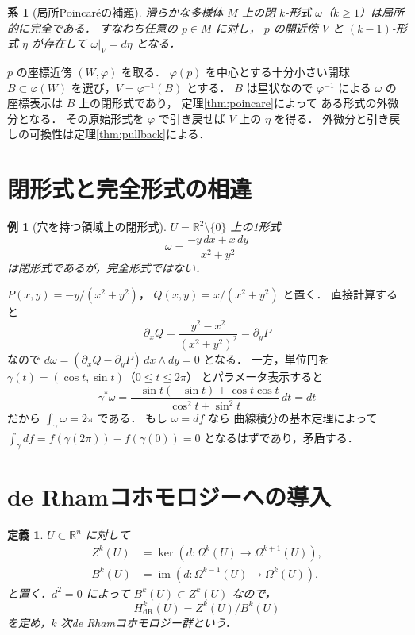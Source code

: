 \documentclass[a5paper,10pt,onecolumn]{jsarticle}
\makeatletter
\theoremstyle{mathnotetheorem}
\newtheorem{definition}[theorem]{定義}
\newtheorem{corollary}[theorem]{系}
\newtheorem{example}[theorem]{例}
\renewcommand{\proofname}{証明}
\renewenvironment{proof}[1][\proofname]{%
  \par\pushQED{\qed}\normalfont\topsep4\p@\@plus2\p@\relax
  \trivlist\item[\hskip\labelsep\bfseries #1]\ignorespaces
}{\popQED\endtrivlist\@endpefalse}
\makeatother
\begin{document}
\begin{corollary}[局所Poincar\'eの補題]\label{cor:local-poincare}
滑らかな多様体 $M$ 上の閉 $k$-形式
$\omega$（$k\ge1$）は局所的に完全である．
すなわち任意の $p\in M$ に対し，
$p$ の開近傍 $V$ と
$(k-1)$-形式 $\eta$ が存在して
$\omega|_V=d\eta$ となる．
\end{corollary}
\begin{proof}
$p$ の座標近傍 $(W,\varphi)$ を取る．
$\varphi(p)$ を中心とする十分小さい開球
$B\subset\varphi(W)$ を選び，$V=\varphi^{-1}(B)$ とする．
$B$ は星状なので
$\varphi^{-1}$ による $\omega$ の座標表示は
$B$ 上の閉形式であり，
定理\ref{thm:poincare}によって
ある形式の外微分となる．
その原始形式を $\varphi$ で引き戻せば
$V$ 上の $\eta$ を得る．
外微分と引き戻しの可換性は定理\ref{thm:pullback}による．
\end{proof}

\section{閉形式と完全形式の相違}

\begin{example}[穴を持つ領域上の閉形式]\label{ex:angular}
$U=\mathbb R^2\setminus\{0\}$ 上の1形式
\[
 \omega=\frac{-y\,dx+x\,dy}{x^2+y^2}
\]
は閉形式であるが，完全形式ではない．
\end{example}
\begin{proof}
$P(x,y)=-y/(x^2+y^2)$，
$Q(x,y)=x/(x^2+y^2)$ と置く．
直接計算すると
\[
 \partial_xQ
 =\frac{y^2-x^2}{(x^2+y^2)^2}
 =\partial_yP
\]
なので
$d\omega=(\partial_xQ-\partial_yP)\,dx\wedge dy=0$
となる．
一方，単位円を
$\gamma(t)=(\cos t,\sin t)$（$0\le t\le2\pi$）
とパラメータ表示すると
\[
 \gamma^*\omega
 =\frac{-\sin t(-\sin t)+\cos t\cos t}
       {\cos^2t+\sin^2t}\,dt=dt
\]
だから
$\int_\gamma\omega=2\pi$ である．
もし $\omega=df$ なら
曲線積分の基本定理によって
$\int_\gamma df=f(\gamma(2\pi))-f(\gamma(0))=0$
となるはずであり，矛盾する．
\end{proof}

\section{de Rhamコホモロジーへの導入}

\begin{definition}
$U\subset\mathbb R^n$ に対して
\[
 \begin{aligned}
 Z^k(U)&=\ker(d:\Omega^k(U)\to\Omega^{k+1}(U)),\\
 B^k(U)&=\operatorname{im}(d:\Omega^{k-1}(U)\to\Omega^k(U)).
 \end{aligned}
\]
と置く．$d^2=0$ によって
$B^k(U)\subset Z^k(U)$ なので，
\[
 H_{\mathrm{dR}}^k(U)=Z^k(U)/B^k(U)
\]
を定め，$k$ 次de Rhamコホモロジー群という．
\end{definition}
\end{document}
